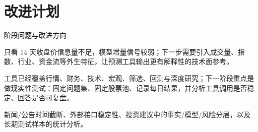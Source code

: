 \documentclass[10pt,aspectratio=43]{beamer}
\begin{document}
\section{改进计划}

\begin{frame}{阶段问题与改进方向}
  \vspace{0.5em}
  \begin{orangebox}[title=LSTM 课程部分]
    \footnotesize
    只看 14 天收盘价信息量不足，模型增量信号较弱；下一步需要引入成交量、指数、行业、资金流等外生特征，让预测工具输出更有解释性的技术面参考。
  \end{orangebox}
  \vspace{0.9em}
  \begin{hlbox}[title=投资助手 Agent 部分]
    \footnotesize
    工具已经覆盖行情、财务、技术、宏观、筛选、回测与深度研究；下一阶段重点是做现实性测试：固定问题集、固定股票池、记录每日结果，并分析工具调用是否稳定、回答是否可复盘。
  \end{hlbox}
  \vspace{0.9em}
  \begin{greenbox}[title=需要继续加强]
    \footnotesize
    新闻/公告时间截断、外部接口稳定性、投资建议中的事实/模型/风险分层，以及长期测试样本的统计分析。
  \end{greenbox}
\end{frame}
\end{document}
